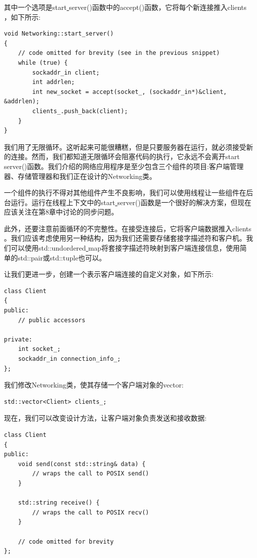 其中一个选项是start\underline{ }server()函数中的accept()函数，它将每个新连接推入clients\underline{ }，如下所示: \par

\begin{lstlisting}[caption={}]
void Networking::start_server()
{
	// code omitted for brevity (see in the previous snippet)
	while (true) {
		sockaddr_in client;
		int addrlen;
		int new_socket = accept(socket_, (sockaddr_in*)&client, &addrlen);
		clients_.push_back(client);
	}
}
\end{lstlisting}

我们用了无限循环。这听起来可能很糟糕，但是只要服务器在运行，就必须接受新的连接。然而，我们都知道无限循环会阻塞代码的执行，它永远不会离开start\underline{ }server()函数。我们介绍的网络应用程序是至少包含三个组件的项目:客户端管理器、存储管理器和我们正在设计的Networking类。 \par
一个组件的执行不得对其他组件产生不良影响，我们可以使用线程让一些组件在后台运行。运行在线程上下文中的start\underline{ }server()函数是一个很好的解决方案，但现在应该关注在第8章中讨论的同步问题。 \par
此外，还要注意前面循环的不完整性。在接受连接后，它将客户端数据推入clients\underline{ }。我们应该考虑使用另一种结构，因为我们还需要存储套接字描述符和客户机。我们可以使用std::undordered\underline{ }map将套接字描述符映射到客户端连接信息，使用简单的std::pair或std::tuple也可以。 \par
让我们更进一步，创建一个表示客户端连接的自定义对象，如下所示: \par

\begin{lstlisting}[caption={}]
class Client
{
public:
	// public accessors
	
private:
	int socket_;
	sockaddr_in connection_info_;
};
\end{lstlisting}

我们修改Networking类，使其存储一个客户端对象的vector: \par

\begin{lstlisting}[caption={}]
std::vector<Client> clients_;
\end{lstlisting}

现在，我们可以改变设计方法，让客户端对象负责发送和接收数据: \par

\begin{lstlisting}[caption={}]
class Client
{
public:
	void send(const std::string& data) {
		// wraps the call to POSIX send()
	}

	std::string receive() {
		// wraps the call to POSIX recv()
	}

	// code omitted for brevity
};
\end{lstlisting}

